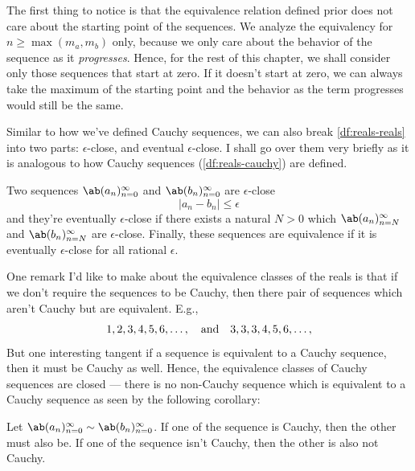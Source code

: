 The first thing to notice is that the equivalence relation defined prior does not care about the
starting point of the sequences. We analyze the equivalency for
$n \geq \max(m_a, m_b)$ only, because we only care about the behavior of the sequence
as it \emph{progresses}. Hence, for the rest of this chapter, we shall consider only
those sequences that start at zero. If it doesn't start at zero, we can always take
the maximum of the starting point and the behavior as the term progresses would still be the same.

Similar to how we've defined Cauchy sequences, we can also break
\cref{df:reals-reals} into two parts: $\epsilon$-close, and eventual
$\epsilon$-close. I shall go over them very briefly as it is analogous to how Cauchy
sequences (\cref{df:reals-cauchy}) are defined.

Two sequences $\sequence{a_n}{n = 0}{\infty}$ and $\sequence{b_n}{n = 0}{\infty}$
are $\epsilon$-close \ifft
\begin{equation}
  |a_n - b_n| \leq \epsilon
\end{equation}
and they're eventually $\epsilon$-close if there exists a natural $N > 0$ which
$\sequence{a_n}{n = N}{\infty}$ and $\sequence{b_n}{n = N}{\infty}$ are
$\epsilon$-close. Finally, these sequences are equivalence if it is eventually
$\epsilon$-close for all rational $\epsilon$.

One remark I'd like to make about the equivalence classes of the reals is that if we
don't require the sequences to be Cauchy, then there pair of sequences which aren't
Cauchy but are equivalent. E.g.,
\begin{equation}
  1, 2, 3, 4, 5, 6, \dots, \quad\textrm{and}\quad 3, 3, 3, 4, 5, 6, \dots,
\end{equation}
But one interesting tangent if a sequence is equivalent to a Cauchy sequence, then it
must be Cauchy as well. Hence, the equivalence classes of Cauchy sequences are closed
--- there is no non-Cauchy sequence which is equivalent to a Cauchy sequence as seen
by the following corollary:

\begin{cor}{}{}
  Let $\sequence{a_n}{n = 0}{\infty} \sim \sequence{b_n}{n = 0}{\infty}$. If one of
  the sequence is Cauchy, then the other must also be. If one of the sequence isn't
  Cauchy, then the other is also not Cauchy.
\end{cor}

